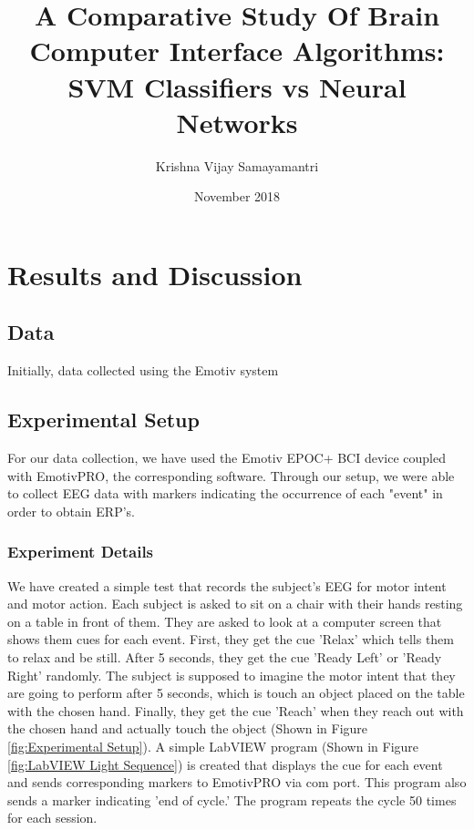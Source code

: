 \documentclass{article}
\title{A Comparative Study Of Brain Computer Interface Algorithms: SVM Classifiers vs Neural Networks}
\author{Krishna Vijay Samayamantri}
\date{November 2018}
\begin{document}
\maketitle

\newpage
\listoffigures 
\listoftables

\newpage
\section{Results and Discussion}
\subsection{Data}
Initially, data collected using the Emotiv system



\subsection{Experimental Setup}
For our data collection, we have used the Emotiv EPOC+ BCI device coupled with EmotivPRO,  the corresponding software. Through our setup, we were able to collect EEG data with markers indicating the occurrence of each "event" in order to obtain ERP's. 







\subsubsection{Experiment Details}
 

We have created a simple test that records the subject's EEG for motor intent and motor action. Each subject is asked to sit on a chair with their hands resting on a table in front of them. They are asked to look at a computer screen that shows them cues for each event. First, they get the cue 'Relax' which tells them to relax and be still. After 5 seconds, they get the cue 'Ready Left' or 'Ready Right' randomly. The subject is supposed to imagine the motor intent that they are going to perform after 5 seconds, which is touch an object placed on the table with the chosen hand. Finally, they get the cue 'Reach' when they reach out with the chosen hand and actually touch the object (Shown in Figure \ref{fig:Experimental Setup}). A simple LabVIEW program (Shown in Figure \ref{fig:LabVIEW Light Sequence}) is created that displays the cue for each event and sends corresponding markers to EmotivPRO via com port. This program also sends a marker indicating 'end of cycle.' The program repeats the cycle 50 times for each session.
\end{document}
